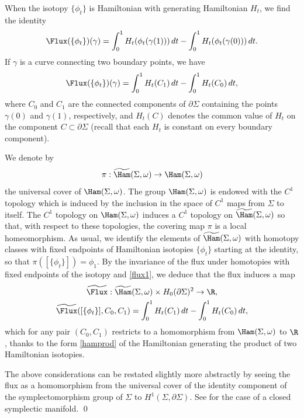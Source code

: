 When the isotopy $\{\phi_t\}$ is Hamiltonian with generating Hamiltonian $H_t$, we find the identity
\[
\Flux(\{\phi_t\})(\gamma) = \int_0^1 H_t(\phi_t(\gamma(1)))\, dt - \int_0^1 H_t(\phi_t(\gamma(0)))\, dt.
\]
If $\gamma$ is a curve connecting two boundary points, we have
\begin{equation}
\label{flux1}
\Flux(\{\phi_t\})(\gamma) = \int_0^1 H_t(C_1)\, dt - \int_0^1 H_t(C_0)\, dt,
\end{equation}
where $C_0$ and $C_1$ are the connected components of $\partial \Sigma$ containing the points $\gamma(0)$ and $\gamma(1)$, respectively, and $H_t(C)$ denotes the common value of $H_t$ on the component $C\subset \partial \Sigma$ (recall that each $H_t$ is constant on every boundary component).

We denote by
\[
\pi: \widetilde{\Ham}(\Sigma,\omega) \to \Ham(\Sigma,\omega)
\]
the universal cover of $\Ham(\Sigma,\omega)$. The group $\Ham(\Sigma,\omega)$ is endowed with the $C^1$ topology which is induced by the inclusion in the space of $C^1$ maps from $\Sigma$ to itself.
The $C^1$ topology on $\Ham(\Sigma,\omega)$ induces a $C^1$ topology on $\widetilde{\Ham}(\Sigma,\omega)$ so that, with respect to these topologies, the covering map $\pi$ is a local homeomorphism.
As usual, we identify the elements of $\widetilde{\Ham}(\Sigma,\omega)$
with homotopy classes with fixed endpoints of Hamiltonian isotopies $\{\phi_t\}$ starting at the identity, so that $\pi([\{\phi_t\}])=\phi_1$.
By the invariance of the flux under homotopies with fixed endpoints of the isotopy and \eqref{flux1}, we deduce that the flux induces a map
\begin{gather*}
\widetilde{\Flux} : \widetilde{\Ham}(\Sigma,\omega) \times H_0(\partial \Sigma)^2 \to \R,
\\
\widetilde{\Flux}([\{\phi_t\}],C_0,C_1) = \int_0^1 H_t(C_1)\, dt - \int_0^1 H_t(C_0)\, dt,
\end{gather*}
which for any pair $(C_0,C_1)$ restricts to a homomorphism from $\Ham(\Sigma,\omega)$ to $\R$, thanks to the form \eqref{hamprod} of the Hamiltonian generating the product of two Hamiltonian isotopies.

\begin{rem}
The above considerations can be restated slightly more abstractly by seeing the flux as a homomorphism from the universal cover of the identity component of the symplectomorphism group of $\Sigma$ to $H^1(\Sigma,\partial \Sigma)$. See \cite[\S 10.2]{McDuff:1998uu} for the case of a closed symplectic manifold.
\hfill\qed
\end{rem}

